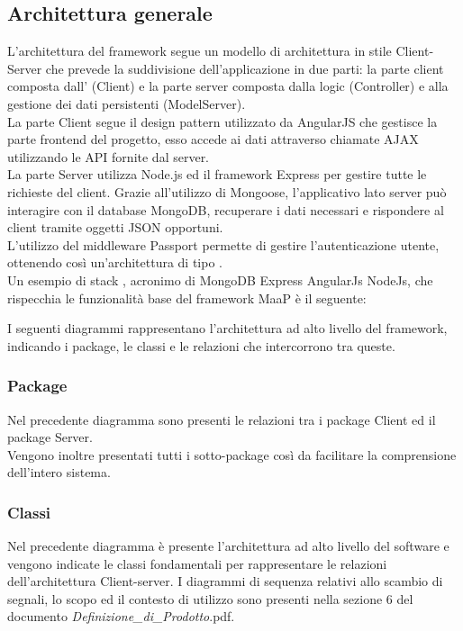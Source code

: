 \subsection{Architettura generale}
L'architettura del framework segue un modello di architettura in stile Client-Server che prevede la suddivisione dell'applicazione in due parti: la parte client composta dall' (Client) e la parte server composta dalla  logic (Controller) e alla gestione dei dati persistenti (ModelServer).\\
La parte Client segue il design pattern  utilizzato da AngularJS che gestisce la parte frontend del progetto, esso accede ai dati attraverso chiamate AJAX utilizzando le API fornite dal server.\\
La parte Server utilizza Node.js ed il framework Express per gestire tutte le richieste  del client. Grazie all'utilizzo di Mongoose, l'applicativo lato server può interagire con il database MongoDB, recuperare i dati necessari e rispondere al client tramite oggetti JSON opportuni.\\ L'utilizzo del middleware Passport permette di gestire l'autenticazione utente, ottenendo così un'architettura di tipo .\\
Un esempio di stack , acronimo di MongoDB Express AngularJs NodeJs, che rispecchia le funzionalità base del framework MaaP è il seguente:

I seguenti diagrammi rappresentano l'architettura ad alto livello del framework, indicando i package, le classi e le relazioni che intercorrono tra queste.

\subsubsection{Package}
Nel precedente diagramma sono presenti le relazioni tra i package Client ed il package Server.\\
Vengono inoltre presentati tutti i sotto-package così da facilitare la comprensione dell'intero sistema.

\subsubsection{Classi}
Nel precedente diagramma è presente l'architettura ad alto livello del software e vengono indicate le classi fondamentali per rappresentare le relazioni dell'architettura Client-server. I diagrammi di sequenza relativi allo scambio di segnali, lo scopo ed il contesto di utilizzo sono presenti nella sezione 6 del documento \emph{Definizione\_di\_Prodotto\versioneDefinizioneDiProdotto{}}.pdf.

